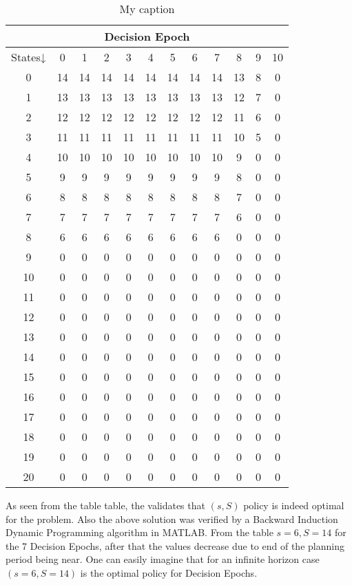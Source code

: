 \documentclass[11pt,a4paper,oneside]{report}
\begin{document}
\begin{table}[H]
\begin{tabular}{|c|c|c|c|c|c|c|c|c|c|c|c|}
\hline
\multicolumn{12}{|c|}{Decision Epoch}                         \\ \hline
States↓ & 0  & 1  & 2  & 3  & 4  & 5  & 6  & 7  & 8  & 9 & 10 \\ \hline
0       & 14 & 14 & 14 & 14 & 14 & 14 & 14 & 14 & 13 & 8 & 0  \\ \hline
1       & 13 & 13 & 13 & 13 & 13 & 13 & 13 & 13 & 12 & 7 & 0  \\ \hline
2       & 12 & 12 & 12 & 12 & 12 & 12 & 12 & 12 & 11 & 6 & 0  \\ \hline
3       & 11 & 11 & 11 & 11 & 11 & 11 & 11 & 11 & 10 & 5 & 0  \\ \hline
4       & 10 & 10 & 10 & 10 & 10 & 10 & 10 & 10 & 9  & 0 & 0  \\ \hline
5       & 9  & 9  & 9  & 9  & 9  & 9  & 9  & 9  & 8  & 0 & 0  \\ \hline
6       & 8  & 8  & 8  & 8  & 8  & 8  & 8  & 8  & 7  & 0 & 0  \\ \hline
7       & 7  & 7  & 7  & 7  & 7  & 7  & 7  & 7  & 6  & 0 & 0  \\ \hline
8       & 6  & 6  & 6  & 6  & 6  & 6  & 6  & 6  & 0  & 0 & 0  \\ \hline
9       & 0  & 0  & 0  & 0  & 0  & 0  & 0  & 0  & 0  & 0 & 0  \\ \hline
10      & 0  & 0  & 0  & 0  & 0  & 0  & 0  & 0  & 0  & 0 & 0  \\ \hline
11      & 0  & 0  & 0  & 0  & 0  & 0  & 0  & 0  & 0  & 0 & 0  \\ \hline
12      & 0  & 0  & 0  & 0  & 0  & 0  & 0  & 0  & 0  & 0 & 0  \\ \hline
13      & 0  & 0  & 0  & 0  & 0  & 0  & 0  & 0  & 0  & 0 & 0  \\ \hline
14      & 0  & 0  & 0  & 0  & 0  & 0  & 0  & 0  & 0  & 0 & 0  \\ \hline
15      & 0  & 0  & 0  & 0  & 0  & 0  & 0  & 0  & 0  & 0 & 0  \\ \hline
16      & 0  & 0  & 0  & 0  & 0  & 0  & 0  & 0  & 0  & 0 & 0  \\ \hline
17      & 0  & 0  & 0  & 0  & 0  & 0  & 0  & 0  & 0  & 0 & 0  \\ \hline
18      & 0  & 0  & 0  & 0  & 0  & 0  & 0  & 0  & 0  & 0 & 0  \\ \hline
19      & 0  & 0  & 0  & 0  & 0  & 0  & 0  & 0  & 0  & 0 & 0  \\ \hline
20      & 0  & 0  & 0  & 0  & 0  & 0  & 0  & 0  & 0  & 0 & 0  \\ \hline
\end{tabular}
\caption{My caption}
\label{wer}
\end{table}
As seen from the table table, the validates that $(s,S)$ policy is indeed optimal for the problem. Also the above solution was verified by a Backward Induction Dynamic Programming algorithm in MATLAB. From the table $s=6, S=14$ for the 7 Decision Epochs, after that the values decrease due to end of the planning period being near. One can easily imagine that for an infinite horizon case $(s=6, S=14)$ is the optimal policy for Decision Epochs. 
\end{document}
